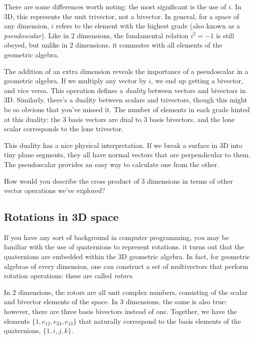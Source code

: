 There are some differences worth noting: the most significant is the use of $i$. In 3D, this
represents the unit trivector, not a bivector. In general, for a space of any dimension, $i$ refers
to the element with the highest grade (also known as a \textit{pseudoscalar}). Like in 2 
dimensions, the fundamental relation $i^2 = -1$ is still obeyed, but unlike in 2 dimensions, it
commutes with all elements of the geometric algebra.

The addition of an extra dimension reveals the importance of a pseudoscalar in a geometric algebra.
If we multiply any vector by $i$, we end up getting a bivector, and vice versa. This operation
defines a \textit{duality} between vectors and bivectors in 3D. Similarly, there's a duality 
between scalars and trivectors, though this might be so obvious that you've missed it. The number
of elements in each grade hinted at this duality: the 3 basis vectors are dual to 3 basis
bivectors, and the lone scalar corresponds to the lone trivector.

This duality has a nice physical interpretation. If we break a surface in 3D into tiny plane
segments, they all have normal vectors that are perpendicular to them. The pseudoscalar provides
an easy way to calculate one from the other.

\begin{expl}
    How would you describe the cross product of 3 dimensions in terms of other vector operations
    we've explored?
\end{expl}

\subsection{Rotations in 3D space}

If you have any sort of background in computer programming, you may be familiar with the use of
quaternions to represent rotations. it turns out that the quaternions are embedded within the 3D
geometric algebra. In fact, for geometric algebras of every dimension, one can construct a set of
multivectors that perform rotation operations: these are called \textit{rotors}.

In 2 dimensions, the rotors are all unit complex numbers, consisting of the scalar and bivector
elements of the space. In 3 dimensions, the same is also true: however, there are three basis 
bivectors instead of one. Together, we have the elements $\{1, e_{12}, e_{23}, e_{13}\}$ that 
naturally correspond to the basis elements of the quaternions, $\{1, i, j, k\}$.

